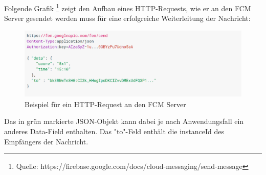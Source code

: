 Folgende Grafik \footnote{Quelle: https://firebase.google.com/docs/cloud-messaging/send-message} zeigt den Aufbau eines HTTP-Requests, wie er an den FCM Server gesendet werden muss für eine erfolgreiche Weiterleitung der Nachricht:

\begin{figure}[H]
	\centering
	\includegraphics[width=1\textwidth]{http_format.png}
	\caption{Beispiel für ein HTTP-Request an den FCM Server}
\end{figure}

Das in grün markierte JSON-Objekt kann dabei je nach Anwendungsfall ein anderes Data-Field enthalten. Das "to"-Feld enthält die instanceId des Empfängers der Nachricht.

